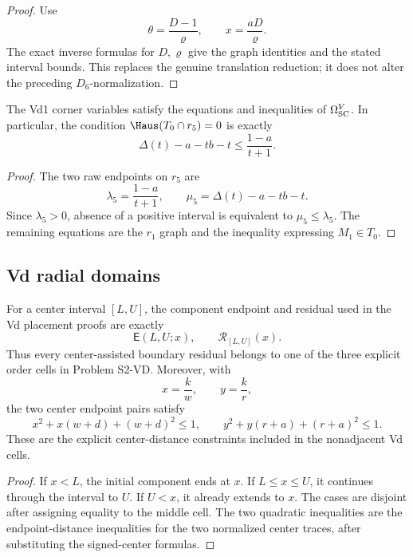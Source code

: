 \begin{proof}
Use
\[
 \theta=\frac{D-1}{\varrho},
 \qquad
 x=\frac{aD}{\varrho}.
\]
The exact inverse formulas for \(D,\varrho\) give the graph identities and
the stated interval bounds.  This replaces the genuine translation reduction;
it does not alter the preceding \(D_6\)-normalization.
\end{proof}

\begin{proposition}
\label{prop:s2-sc-vd1-bridge}
The Vd1 corner variables satisfy the equations and inequalities of
\(\Omega_{\rm SC}^{V}\).  In particular, the condition
\(\Haus(T_0\cap r_5)=0\) is exactly
\[
 \Delta(t)-a-tb-t\le\frac{1-a}{t+1}.
\]
\end{proposition}

\begin{proof}
The two raw endpoints on $r_5$ are
\[
 \lambda_5=\frac{1-a}{t+1},
 \qquad
 \mu_5=\Delta(t)-a-tb-t.
\]
Since \(\lambda_5>0\), absence of a positive interval is equivalent to
\(\mu_5\le\lambda_5\).  The remaining equations are the $r_1$ graph and
the inequality expressing $M_1\in T_0$.
\end{proof}

\subsection{Vd radial domains}

\begin{proposition}
\label{prop:s2-vd-residual-bridge}
For a center interval \([L,U]\), the component endpoint and residual used in
the Vd placement proofs are exactly
\[
 \mathsf E(L,U;x),\qquad \mathcal R_{[L,U]}(x).
\]
Thus every center-assisted boundary residual belongs to one of the three
explicit order cells in Problem S2-VD.  Moreover, with
\[
 x=\frac{k}{w},\qquad y=\frac{k}{r},
\]
the two center endpoint pairs satisfy
\[
 x^2+x(w+d)+(w+d)^2\le1,\qquad
 y^2+y(r+a)+(r+a)^2\le1.
\]
These are the explicit center-distance constraints included in the
nonadjacent Vd cells.
\end{proposition}

\begin{proof}
If \(x<L\), the initial component ends at \(x\).  If \(L\le x\le U\), it
continues through the interval to \(U\).  If \(U<x\), it already extends to
\(x\).  The cases are disjoint after assigning equality to the middle cell.  The two
quadratic inequalities are the endpoint-distance inequalities for the two
normalized center traces, after substituting the signed-center formulas.
\end{proof}

